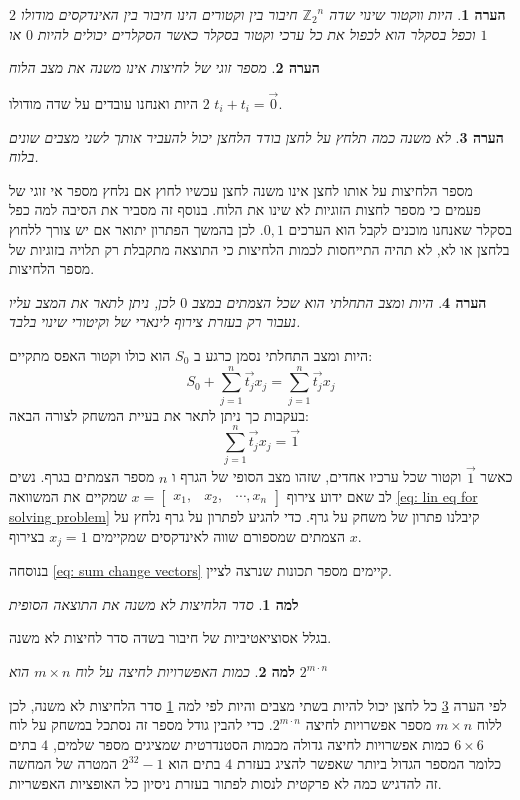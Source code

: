 \documentclass[12pt,leqno]{article}
\theoremstyle{theoremdd}
\newtheorem{lemma}{למה}[section]
\newtheorem{comm}{הערה}[section]
\newcommand{\sumi}[1]{\sum_{#1=1}^n}
\newcommand{\Zn}{{\mathbb{Z}_2}^n}
\begin{document}
\begin{comm}
    היות ווקטור שינוי שדה
    $\Zn$
    חיבור בין וקטורים הינו חיבור בין האינדקסים מודולו 
    $2$
    וכפל בסקלר
    הוא לכפול את כל ערכי וקטור בסקלר
    כאשר הסקלרים יכולים להיות
    $0$
    או 
    $1$
\end{comm}
\begin{comm}
    מספר זוגי של לחיצות אינו משנה את מצב הלוח
\end{comm}
היות 
ואנחנו עובדים על שדה מודולו 
$2$
$t_i + t_i = \vec{0}$.
\begin{comm}
    \label{comm: press is uneven presses}
    לא משנה כמה תלחץ על לחצן בודד הלחצן 
    יכול להעביר אותך לשני מצבים שונים בלוח.
\end{comm}
מספר הלחיצות על אותו לחצן אינו משנה 
לחצן עכשיו 
לחוץ אם נלחץ מספר אי זוגי של פעמים 
כי מספר לחצות הזוגיות לא שינו את הלוח.
בנוסף זה מסביר את הסיבה למה כפל בסקלר שאנחנו מוכנים לקבל הוא הערכים 
$0,1$.
לכן בהמשך
הפתרון יתואר אם יש צורך ללחוץ בלחצן או לא,
לא תהיה התייחסות לכמות הלחיצות כי התוצאה מתקבלת רק תלויה בזוגיות של מספר הלחיצות.
\begin{comm}
    היות ומצב התחלתי הוא שכל הצמתים 
    במצב 
    $0$
    לכן,
    ניתן לתאר 
    את המצב עליו נעבור
    רק
    בעזרת צירוף לינארי של וקיטורי שינוי בלבד.
\end{comm}
היות ומצב התחלתי נסמן כרגע ב
$S_0$
הוא כולו וקטור האפס
מתקיים:
\begin{equation}
    \label{eq: sum change vectors}
    S_0 + \sumi{j} \vec{t_j} x_j=  \sumi{j}  \vec{t_j}x_j
\end{equation}
בעקבות כך ניתן לתאר את בעיית המשחק לצורה הבאה:
\begin{equation}
    \label{eq: lin eq for solving problem}
    \sumi{j} \vec{t_j} x_j = \vec{1}
\end{equation}
כאשר
$\vec{1}$
וקטור שכל ערכיו אחדים,
שזהו מצב הסופי של הגרף
ו
$n$
מספר הצמתים בגרף.
נשים לב 
שאם 
ידוע צירוף
$x = \begin{bmatrix}
    x_1, & x_2, & \cdots , x_n
\end{bmatrix}$
שמקיים את המשוואה 
\ref{eq: lin eq for solving problem}
קיבלנו פתרון של משחק על גרף.
כדי להגיע לפתרון על גרף נלחץ על הצמתים שמספורם 
שווה 
לאינדקסים 
שמקיימים
$x_j = 1$
בצירוף 
$x$.

בנוסחה
\ref{eq: sum change vectors}
קיימים מספר תכונות 
שנרצה לציין.
\begin{lemma}
    \label{lemma: order presses}
    סדר הלחיצות לא משנה את התוצאה הסופית
\end{lemma}
בגלל אסוציאטיביות של חיבור בשדה 
סדר לחיצות לא משנה.
\begin{lemma}
    \label{lemma: num presses}
    כמות האפשרויות לחיצה על לוח
    $m \times n$
    הוא 
    $2^{m \cdot n}$
\end{lemma}
לפי הערה 
\ref{comm: press is uneven presses}
כל לחצן יכול להיות בשתי מצבים 
והיות לפי
למה
\ref{lemma: order presses}
סדר הלחיצות לא משנה,
לכן ללוח
$m \times n$
מספר אפשרויות לחיצה 
$2^{m \cdot n}$.
כדי להבין גודל מספר זה נסתכל במשחק על לוח 
$6 \times 6$
כמות  אפשרויות לחיצה גדולה 
מכמות הסטנדרטית שמציגים מספר שלמים,
$4$
בתים
כלומר המספר הגדול ביותר שאפשר להציג  בעזרת 
$4$
בתים
הוא
$2^{32}-1$
המטרה של המחשה זה להדגיש כמה לא פרקטית לנסות לפתור בעזרת
ניסיון כל האופציות האפשריות.
\end{document}
